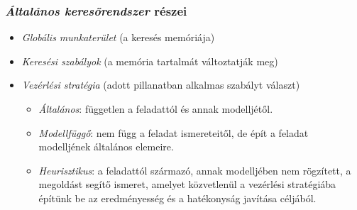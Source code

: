 \documentclass[12pt,margin=0px]{article}
\begin{document}
	\subsubsection*{\textit{Általános keresőrendszer} részei}

    \begin{itemize}
        \item \textit{{Globális munkaterület}} (a keresés memóriája)
        \item \textit{{Keresési szabályok}} (a memória tartalmát változtatják meg)
        \item \textit{{Vezérlési stratégia}} (adott pillanatban alkalmas szabályt választ)
        \begin{itemize}
            \item \emph{Általános}: független a feladattól és annak modelljétől.
            \item \emph{Modellfüggő}: nem függ a feladat ismereteitől, de épít a feladat modelljének általános elemeire.
            \item \emph{Heurisztikus}: a feladattól származó, annak modelljében nem rögzített, a megoldást segítő ismeret, amelyet közvetlenül a vezérlési stratégiába építünk be az eredményesség és a hatékonyság javítása céljából.
	   \end{itemize}
    \end{itemize}
\end{document}
